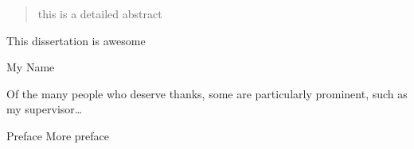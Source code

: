 \maketitle

\begin{abstract}%
   this is a detailed abstract
\end{abstract}


\begin{declaration}
  This dissertation is awesome
  \vspace*{1cm}
  \begin{flushright}
    My Name
  \end{flushright}
\end{declaration}


\begin{acknowledgements}
  Of the many people who deserve thanks, some are particularly prominent,
  such as my supervisor\dots
\end{acknowledgements}


\begin{preface}
 Preface
 \noindent
 More preface
\end{preface}

\dedication{To me...}

\tableofcontents



